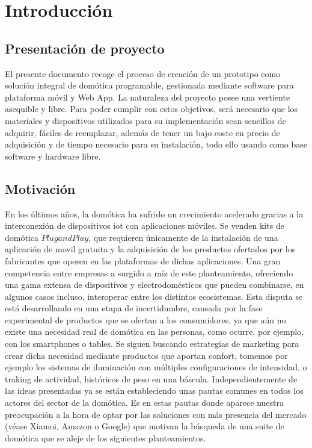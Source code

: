 \cleardoublepage

\chapter{Introducción}

\section{Presentación de proyecto}
\label{ch:Capitulo1}
El presente documento recoge el proceso de creación de un prototipo como solución integral de domótica programable, gestionada mediante software para plataforma móvil y Web App. La naturaleza del proyecto posee una vertiente asequible y libre. Para poder cumplir con estos objetivos, será necesario que los materiales y dispositivos utilizados para su implementación sean sencillos de adquirir, fáciles de reemplazar, además de tener un bajo coste en precio de adquisición y de tiempo necesario para su instalación, todo ello usando como base software y hardware libre.

\section{Motivación}
\label{ch:Capitulo1.1}

En los últimos años, la domótica ha sufrido un crecimiento acelerado gracias a la interconexión de dispositivos \gls{iot} con aplicaciones móviles. Se venden kits de domótica $Plug and Play$, que requieren únicamente de la instalación de una aplicación de movil gratuita y la adquisición de los productos ofertados por los fabricantes que operen en las plataformas de dichas aplicaciones. Una gran competencia entre empresas a surgido a raíz de este planteamiento, ofreciendo una gama extensa de dispositivos y electrodomésticos que pueden combinarse, en algunos casos incluso, interoperar entre los distintos ecosistemas. Esta disputa se está desarrollando en una etapa de incertidumbre, causada por la fase experimental de productos que se ofertan a los consumidores, ya que aún no existe una necesidad real de domótica en las personas, como ocurre, por ejemplo, con los smartphones o tables. Se siguen buscando estrategias de marketing para crear dicha necesidad mediante productos que aportan confort, tomemos por ejemplo los sistemas de iluminación con múltiples configuraciones de intensidad, o traking de actividad, históricos de peso en una báscula. Independientemente de las ideas presentadas ya se están estableciendo unas pautas comunes en todos los actores del sector de la domótica. Es en estas pautas donde aparece nuestra preocupación a la hora de optar por las soluciones con más presencia del mercado (véase Xiamoi, Amazon o Google) que motivan la búsqueda de una suite de domótica que se aleje de los siguientes planteamientos.

